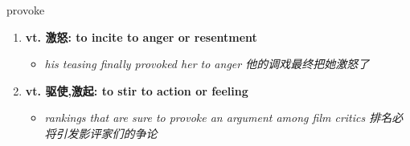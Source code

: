 
\begin{frame}
{\huge provoke}
\begin{center}
\begin{enumerate}\Large
  \item \textbf{vt. 激怒: to incite to anger or resentment}
  \begin{itemize}
    \item \em{\Large{his teasing finally provoked her to anger 他的调戏最终把她激怒了}}
  \end{itemize}
  \item \textbf{vt. 驱使,激起: to stir to action or feeling}
  \begin{itemize}
    \item \em{\Large{rankings that are sure to provoke an argument among film critics 排名必将引发影评家们的争论}}
  \end{itemize}
\end{enumerate}
\end{center}
\end{frame}

